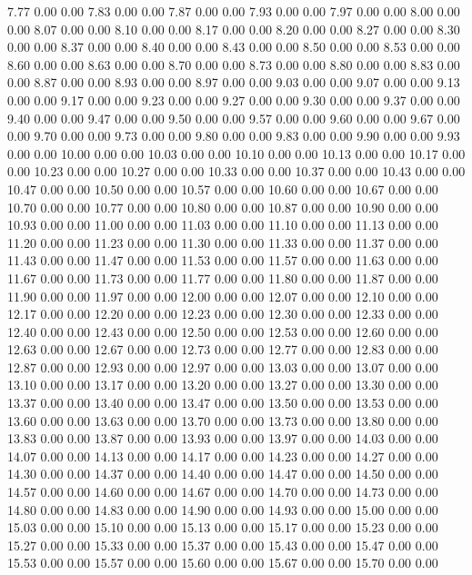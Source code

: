 {7.77 0.00 0.00
7.83 0.00 0.00
7.87 0.00 0.00
7.93 0.00 0.00
7.97 0.00 0.00
8.00 0.00 0.00
8.07 0.00 0.00
8.10 0.00 0.00
8.17 0.00 0.00
8.20 0.00 0.00
8.27 0.00 0.00
8.30 0.00 0.00
8.37 0.00 0.00
8.40 0.00 0.00
8.43 0.00 0.00
8.50 0.00 0.00
8.53 0.00 0.00
8.60 0.00 0.00
8.63 0.00 0.00
8.70 0.00 0.00
8.73 0.00 0.00
8.80 0.00 0.00
8.83 0.00 0.00
8.87 0.00 0.00
8.93 0.00 0.00
8.97 0.00 0.00
9.03 0.00 0.00
9.07 0.00 0.00
9.13 0.00 0.00
9.17 0.00 0.00
9.23 0.00 0.00
9.27 0.00 0.00
9.30 0.00 0.00
9.37 0.00 0.00
9.40 0.00 0.00
9.47 0.00 0.00
9.50 0.00 0.00
9.57 0.00 0.00
9.60 0.00 0.00
9.67 0.00 0.00
9.70 0.00 0.00
9.73 0.00 0.00
9.80 0.00 0.00
9.83 0.00 0.00
9.90 0.00 0.00
9.93 0.00 0.00
10.00 0.00 0.00
10.03 0.00 0.00
10.10 0.00 0.00
10.13 0.00 0.00
10.17 0.00 0.00
10.23 0.00 0.00
10.27 0.00 0.00
10.33 0.00 0.00
10.37 0.00 0.00
10.43 0.00 0.00
10.47 0.00 0.00
10.50 0.00 0.00
10.57 0.00 0.00
10.60 0.00 0.00
10.67 0.00 0.00
10.70 0.00 0.00
10.77 0.00 0.00
10.80 0.00 0.00
10.87 0.00 0.00
10.90 0.00 0.00
10.93 0.00 0.00
11.00 0.00 0.00
11.03 0.00 0.00
11.10 0.00 0.00
11.13 0.00 0.00
11.20 0.00 0.00
11.23 0.00 0.00
11.30 0.00 0.00
11.33 0.00 0.00
11.37 0.00 0.00
11.43 0.00 0.00
11.47 0.00 0.00
11.53 0.00 0.00
11.57 0.00 0.00
11.63 0.00 0.00
11.67 0.00 0.00
11.73 0.00 0.00
11.77 0.00 0.00
11.80 0.00 0.00
11.87 0.00 0.00
11.90 0.00 0.00
11.97 0.00 0.00
12.00 0.00 0.00
12.07 0.00 0.00
12.10 0.00 0.00
12.17 0.00 0.00
12.20 0.00 0.00
12.23 0.00 0.00
12.30 0.00 0.00
12.33 0.00 0.00
12.40 0.00 0.00
12.43 0.00 0.00
12.50 0.00 0.00
12.53 0.00 0.00
12.60 0.00 0.00
12.63 0.00 0.00
12.67 0.00 0.00
12.73 0.00 0.00
12.77 0.00 0.00
12.83 0.00 0.00
12.87 0.00 0.00
12.93 0.00 0.00
12.97 0.00 0.00
13.03 0.00 0.00
13.07 0.00 0.00
13.10 0.00 0.00
13.17 0.00 0.00
13.20 0.00 0.00
13.27 0.00 0.00
13.30 0.00 0.00
13.37 0.00 0.00
13.40 0.00 0.00
13.47 0.00 0.00
13.50 0.00 0.00
13.53 0.00 0.00
13.60 0.00 0.00
13.63 0.00 0.00
13.70 0.00 0.00
13.73 0.00 0.00
13.80 0.00 0.00
13.83 0.00 0.00
13.87 0.00 0.00
13.93 0.00 0.00
13.97 0.00 0.00
14.03 0.00 0.00
14.07 0.00 0.00
14.13 0.00 0.00
14.17 0.00 0.00
14.23 0.00 0.00
14.27 0.00 0.00
14.30 0.00 0.00
14.37 0.00 0.00
14.40 0.00 0.00
14.47 0.00 0.00
14.50 0.00 0.00
14.57 0.00 0.00
14.60 0.00 0.00
14.67 0.00 0.00
14.70 0.00 0.00
14.73 0.00 0.00
14.80 0.00 0.00
14.83 0.00 0.00
14.90 0.00 0.00
14.93 0.00 0.00
15.00 0.00 0.00
15.03 0.00 0.00
15.10 0.00 0.00
15.13 0.00 0.00
15.17 0.00 0.00
15.23 0.00 0.00
15.27 0.00 0.00
15.33 0.00 0.00
15.37 0.00 0.00
15.43 0.00 0.00
15.47 0.00 0.00
15.53 0.00 0.00
15.57 0.00 0.00
15.60 0.00 0.00
15.67 0.00 0.00
15.70 0.00 0.00
}
